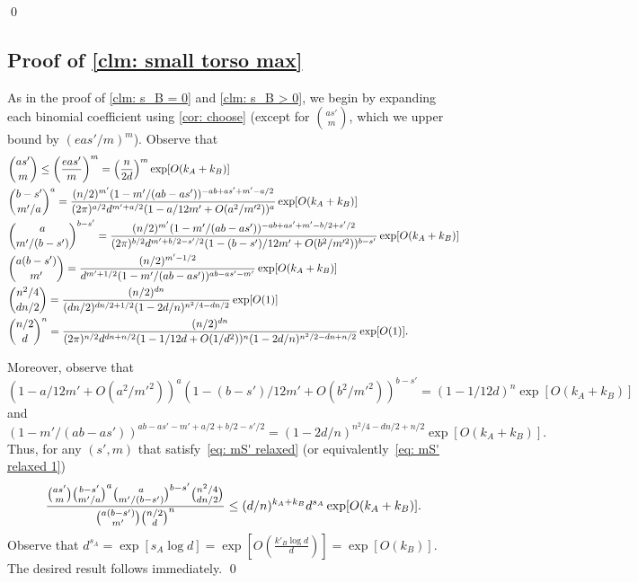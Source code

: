 \documentclass[11pt]{article}
\theoremstyle{plain}
\begin{document}
\qed

\subsection{Proof of \cref{clm: small torso max}}\label{sec: small torso max}
As in the proof of \cref{clm: s_B = 0} and \cref{clm: s_B > 0}, we begin by expanding each binomial coefficient using \cref{cor: choose} (except for $\binom{as'}{m}$, which we upper bound by $(eas'/m)^{m}$). Observe that
\begin{align}
    &\binom{as'}{m} \leq \left(\frac{eas'}{m}\right)^{m} = \left(\frac{n}{2d}\right)^{m}\exp[O(k_A + k_B)] \notag\\
    &\binom{b - s'}{m'/a}^a = \frac{(n/2)^{m'}(1 - m'/(ab - as'))^{-ab + as' +m' -a/2}}{(2\pi)^{a/2}d^{m' + a/2}(1 - a/12m' + O(a^2/m'^2))^{a}}\exp[O(k_A + k_B)]\notag\\
    &\binom{a}{m'/(b - s')}^{b - s'} = \frac{(n/2)^{m'}(1 - m'/(ab - as'))^{-ab + as' +m' -b/2 + s'/2}}{(2\pi)^{b/2}d^{m' + b/2 - s'/2}(1 - (b-s')/12m' + O(b^2/m'^2))^{b-s'}}\exp[O(k_A + k_B)]\notag\\
    &\binom{a(b-s')}{m'} = \frac{(n/2)^{m'  - 1/2}}{d^{m' + 1/2}(1 - m'/(ab - as'))^{ab - as' - m'}}\exp[O(k_A + k_B)]\notag\\
    &\binom{n^2/4}{dn/2}   = \frac{(n/2)^{dn}}{(dn/2)^{dn/2 + 1/2}(1 - 2d/n)^{n^2/4 - dn/2}}\exp[O(1)]\notag\\
     &\binom{n/2}{d}^n = \frac{(n/2)^{dn}}{(2\pi)^{n/2}d^{dn + n/2}(1 - 1/12d + O(1/d^2))^{n}(1 - 2d/n)^{n^2/2 - dn + n/2}}\exp[O(1)].\notag
\end{align}

Moreover, observe that 
\[
(1 - a/12m' + O(a^2/m'^2))^a(1 - (b-s')/12m' + O(b^2/m'^2))^{b - s'} = (1 - 1/12d)^n\exp[O(k_A + k_B)]
\]
and 
\[
(1 - m'/(ab - as'))^{ab - as' - m' + a/2 + b/2 - s'/2} = (1 - 2d/n)^{n^2/4 - dn/2 + n/2}\exp[O(k_A + k_B)].
\]
Thus, for any $(s', m)$ that satisfy~\eqref{eq: mS' relaxed} (or equivalently~\eqref{eq: mS' relaxed 1})
\begin{equation}\notag
    \frac{ \binom{as'}{m}\binom{b - s'}{m'/a}^a\binom{a}{m'/(b - s')}^{b-s'}\binom{n^2/4}{dn/2}}{\binom{a(b - s')}{m'}\binom{n/2}{d}^n} \leq (d/n)^{k_A + k_B}d^{s_A}\exp[O(k_A + k_B)].
\end{equation}
Observe that $d^{s_A} = \exp[s_A\log d] = \exp\left[O\left(\frac{k'_B\log d}{d}\right)\right] = \exp[O(k_B)]$. The desired result follows immediately.
\qed
\end{document}
